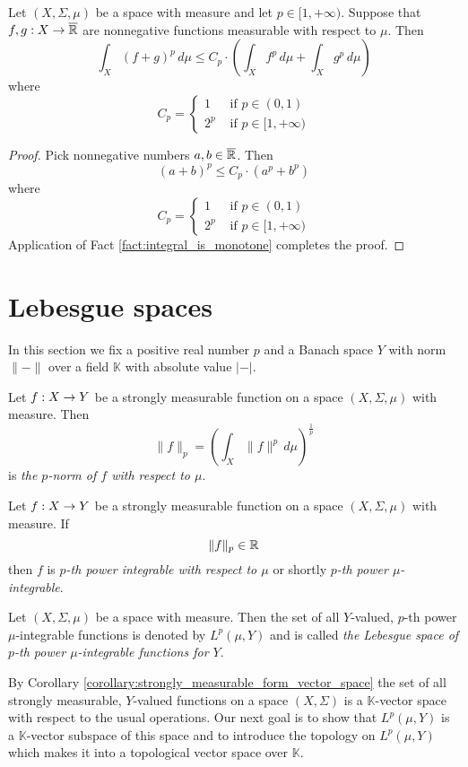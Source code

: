 \begin{proposition}\label{proposition:p_power_of_norm_inequality}
Let $(X,\Sigma,\mu)$ be a space with measure and let $p \in [1,+\infty)$. Suppose that $f,g:X\rightarrow \overline{{\mathbb R}}$ are nonnegative functions measurable with respect to $\mu$. Then
$$\int_X\left(f + g\right)^p\,d\mu \leq C_p\cdot 
\left(\int_X f^p\,d\mu + \int_X g^p\,d\mu\right)$$
where 
$$C_p = \begin{cases}
1&\mbox{ if }p\in (0,1)\\
2^p&\mbox{ if }p\in [1,+\infty)
\end{cases}$$
\end{proposition}
\begin{proof}
Pick nonnegative numbers $a,b\in \overline{{\mathbb R}}$. Then
$$\left(a + b\right)^p \leq C_p\cdot \left(a^p + b^p\right)$$
where 
$$C_p = \begin{cases}
1&\mbox{ if }p\in (0,1)\\
2^p&\mbox{ if }p\in [1,+\infty)
\end{cases}$$
Application of Fact \ref{fact:integral_is_monotone} completes the proof.
\end{proof}

\section{Lebesgue spaces}\label{section:lebesgue_spaces}
\noindent
In this section we fix a positive real number $p$ and a Banach space $Y$ with norm $\lVert-\rVert$ over a field $\mathbb{K}$ with absolute value $|-|$.

\begin{definition}
Let $f:X\rightarrow Y$ be a strongly measurable function on a space $(X,\Sigma,\mu)$ with measure. Then 
$$\lVert f\rVert_p = \left(\int_X\lVert f\rVert^p\,d\mu\right)^{\frac{1}{p}}$$
is \textit{the $p$-norm of $f$ with respect to $\mu$}.
\end{definition}

\begin{definition}
Let $f:X\rightarrow Y$ be a strongly measurable function on a space $(X,\Sigma,\mu)$ with measure. If
$$\lVert f\rVert_p \in {\mathbb R}$$
then $f$ is \textit{$p$-th power integrable with respect to $\mu$} or shortly \textit{$p$-th power $\mu$-integrable}.
\end{definition}

\begin{definition}
Let $(X,\Sigma,\mu)$ be a space with measure. Then the set of all $Y$-valued, $p$-th power $\mu$-integrable functions is denoted by $L^p(\mu,Y)$ and is called \textit{the Lebesgue space of $p$-th power $\mu$-integrable functions for $Y$}.
\end{definition}
\noindent
By Corollary \ref{corollary:strongly_measurable_form_vector_space} the set of all strongly measurable, $Y$-valued functions on a space $(X,\Sigma)$ is a $\mathbb{K}$-vector space with respect to the usual operations. Our next goal is to show that $L^p(\mu,Y)$ is a $\mathbb{K}$-vector subspace of this space and to introduce the topology on $L^p(\mu,Y)$ which makes it into a topological vector space over $\mathbb{K}$. 

